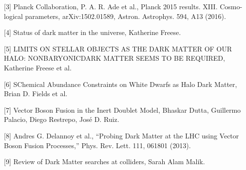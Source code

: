 \vspace{0.5cm}

[3] Planck Collaboration, P. A. R. Ade et al., Planck 2015 results. XIII. Cosmo-
logical parameters, arXiv:1502.01589, Astron. Astrophys. 594, A13 (2016).

\vspace{0.5cm}

[4] Status of dark matter in the universe, Katherine Freese.

\vspace{0.5cm}

[5] LIMITS ON STELLAR OBJECTS AS THE DARK MATTER OF OUR HALO: NONBARYONICDARK MATTER SEEMS TO BE REQUIRED, Katherine Freese et al.

\vspace{0.5cm}

[6] SChemical Abundance Constraints on White Dwarfs as Halo Dark Matter, Brian D. Fields et al.

\vspace{0.5cm}

[7] Vector Boson Fusion in the Inert Doublet Model, Bhaskar Dutta, Guillermo Palacio, Diego Restrepo, José D. Ruiz.

\vspace{0.5cm}

[8] Andres G. Delannoy et al., “Probing Dark Matter at the LHC using Vector Boson Fusion
Processes,” Phys. Rev. Lett. 111, 061801 (2013).

\vspace{0.5cm}

[9] Review of Dark Matter searches at colliders, Sarah Alam Malik.


